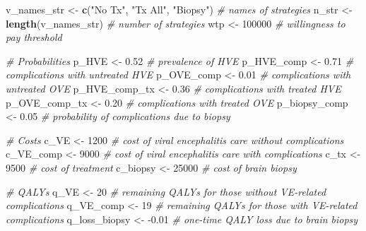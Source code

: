 \documentclass[
]{article}
\newenvironment{Shaded}{\begin{snugshade}}{\end{snugshade}}
\newcommand{\CommentTok}[1]{\textcolor[rgb]{0.56,0.35,0.01}{\textit{#1}}}
\newcommand{\DecValTok}[1]{\textcolor[rgb]{0.00,0.00,0.81}{#1}}
\newcommand{\FloatTok}[1]{\textcolor[rgb]{0.00,0.00,0.81}{#1}}
\newcommand{\KeywordTok}[1]{\textcolor[rgb]{0.13,0.29,0.53}{\textbf{#1}}}
\newcommand{\NormalTok}[1]{#1}
\newcommand{\StringTok}[1]{\textcolor[rgb]{0.31,0.60,0.02}{#1}}
\begin{document}
\begin{Shaded}
\begin{Highlighting}[]
\NormalTok{v_names_str   <-}\StringTok{ }\KeywordTok{c}\NormalTok{(}\StringTok{"No Tx"}\NormalTok{, }\StringTok{"Tx All"}\NormalTok{, }\StringTok{"Biopsy"}\NormalTok{)    }\CommentTok{# names of strategies}
\NormalTok{n_str         <-}\StringTok{ }\KeywordTok{length}\NormalTok{(v_names_str)               }\CommentTok{# number of strategies}
\NormalTok{wtp           <-}\StringTok{ }\DecValTok{100000}                            \CommentTok{# willingness to pay threshold}

\CommentTok{# Probabilities}
\NormalTok{p_HVE         <-}\StringTok{ }\FloatTok{0.52}   \CommentTok{# prevalence of HVE}
\NormalTok{p_HVE_comp    <-}\StringTok{ }\FloatTok{0.71}   \CommentTok{# complications with untreated HVE}
\NormalTok{p_OVE_comp    <-}\StringTok{ }\FloatTok{0.01}   \CommentTok{# complications with untreated OVE}
\NormalTok{p_HVE_comp_tx <-}\StringTok{ }\FloatTok{0.36}   \CommentTok{# complications with treated HVE}
\NormalTok{p_OVE_comp_tx <-}\StringTok{ }\FloatTok{0.20}   \CommentTok{# complications with treated OVE}
\NormalTok{p_biopsy_comp <-}\StringTok{ }\FloatTok{0.05}   \CommentTok{# probability of complications due to biopsy}

\CommentTok{# Costs}
\NormalTok{c_VE          <-}\StringTok{ }\DecValTok{1200}   \CommentTok{# cost of viral encephalitis care without complications}
\NormalTok{c_VE_comp     <-}\StringTok{ }\DecValTok{9000}   \CommentTok{# cost of viral encephalitis care with complications}
\NormalTok{c_tx          <-}\StringTok{ }\DecValTok{9500}   \CommentTok{# cost of treatment}
\NormalTok{c_biopsy      <-}\StringTok{ }\DecValTok{25000}  \CommentTok{# cost of brain biopsy}

\CommentTok{# QALYs}
\NormalTok{q_VE          <-}\StringTok{ }\DecValTok{20}     \CommentTok{# remaining QALYs for those without VE-related complications}
\NormalTok{q_VE_comp     <-}\StringTok{ }\DecValTok{19}     \CommentTok{# remaining QALYs for those with VE-related complications}
\NormalTok{q_loss_biopsy <-}\StringTok{ }\FloatTok{-0.01}  \CommentTok{# one-time QALY loss due to brain biopsy}


\end{Highlighting}
\end{Shaded}
\end{document}
